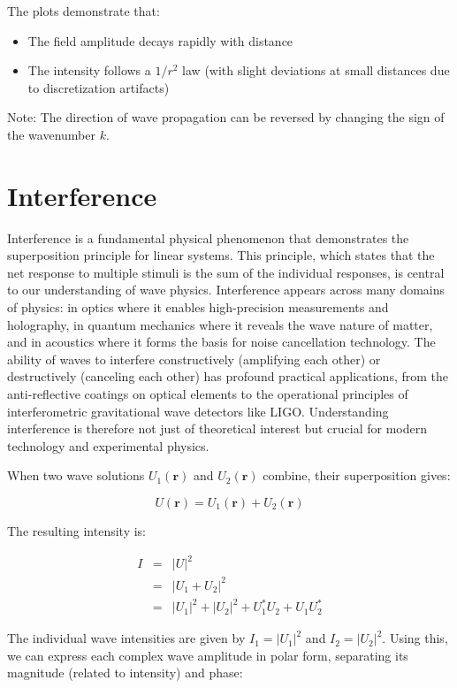 \documentclass[
  a4paper,
]{book}
\providecommand{\tightlist}{%
  \setlength{\itemsep}{0pt}\setlength{\parskip}{0pt}}
\begin{document}
The plots demonstrate that:

\begin{itemize}
\tightlist
\item
  The field amplitude decays rapidly with distance
\item
  The intensity follows a \(1/r^2\) law (with slight deviations at small
  distances due to discretization artifacts)
\end{itemize}

Note: The direction of wave propagation can be reversed by changing the
sign of the wavenumber \(k\).

\chapter{Interference}\label{interference}

Interference is a fundamental physical phenomenon that demonstrates the
superposition principle for linear systems. This principle, which states
that the net response to multiple stimuli is the sum of the individual
responses, is central to our understanding of wave physics. Interference
appears across many domains of physics: in optics where it enables
high-precision measurements and holography, in quantum mechanics where
it reveals the wave nature of matter, and in acoustics where it forms
the basis for noise cancellation technology. The ability of waves to
interfere constructively (amplifying each other) or destructively
(canceling each other) has profound practical applications, from the
anti-reflective coatings on optical elements to the operational
principles of interferometric gravitational wave detectors like LIGO.
Understanding interference is therefore not just of theoretical interest
but crucial for modern technology and experimental physics.

When two wave solutions \(U_1(\mathbf{r})\) and \(U_2(\mathbf{r})\)
combine, their superposition gives:

\[
U(\mathbf{r})=U_1(\mathbf{r})+U_2(\mathbf{r})
\]

The resulting intensity is:

\begin{eqnarray}
I &= &|U|^2\\
&= &|U_1+U_2|^2\\
&= &|U_1|^2+|U_2|^2+U^{*}_1 U_2 + U_1 U^{*}_2
\end{eqnarray}

The individual wave intensities are given by \(I_1=|U_1|^2\) and
\(I_2=|U_2|^2\). Using this, we can express each complex wave amplitude
in polar form, separating its magnitude (related to intensity) and
phase:
\end{document}
